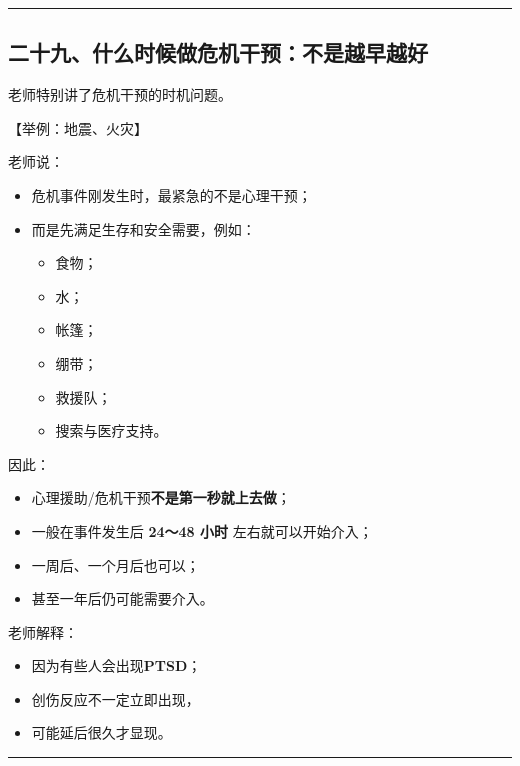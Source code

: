 \documentclass[
  chinese,
  9pt,
  a4paper,
]{ctexart}
\providecommand{\tightlist}{%
  \setlength{\itemsep}{0pt}\setlength{\parskip}{0pt}}
\begin{document}
\begin{center}\rule{0.5\linewidth}{0.5pt}\end{center}

\subsection{二十九、什么时候做危机干预：不是越早越好}\label{ux4e8cux5341ux4e5dux4ec0ux4e48ux65f6ux5019ux505aux5371ux673aux5e72ux9884ux4e0dux662fux8d8aux65e9ux8d8aux597d}

老师特别讲了危机干预的时机问题。

【举例：地震、火灾】

老师说：

\begin{itemize}
\item
  危机事件刚发生时，最紧急的不是心理干预；
\item
  而是先满足生存和安全需要，例如：

  \begin{itemize}
  \tightlist
  \item
    食物；
  \item
    水；
  \item
    帐篷；
  \item
    绷带；
  \item
    救援队；
  \item
    搜索与医疗支持。
  \end{itemize}
\end{itemize}

因此：

\begin{itemize}
\tightlist
\item
  心理援助/危机干预\textbf{不是第一秒就上去做}；
\item
  一般在事件发生后 \textbf{24～48 小时} 左右就可以开始介入；
\item
  一周后、一个月后也可以；
\item
  甚至一年后仍可能需要介入。
\end{itemize}

老师解释：

\begin{itemize}
\tightlist
\item
  因为有些人会出现\textbf{PTSD}；
\item
  创伤反应不一定立即出现，
\item
  可能延后很久才显现。
\end{itemize}

\begin{center}\rule{0.5\linewidth}{0.5pt}\end{center}
\end{document}
